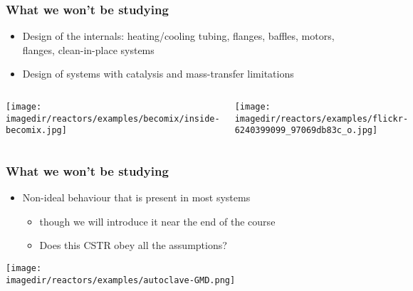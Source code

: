 \begin{frame}\frametitle{What we won't be studying}
	\begin{itemize}
		\item	Design of the internals: heating/cooling tubing, flanges, baffles, motors, flanges, clean-in-place systems
		\item	Design of systems with catalysis and mass-transfer limitations
	\end{itemize}
	\vspace{-12pt}
	\begin{columns}[t]
			\begin{center}
		\texttt{[image: \\imagedir/reactors/examples/becomix/inside-becomix.jpg]}
	\end{center}
			\begin{center}
				\texttt{[image: \\imagedir/reactors/examples/flickr-6240399099\_97069db83c\_o.jpg]}
			\end{center}
			
	\end{columns}	
\end{frame}

\begin{frame}\frametitle{What we won't be studying}
	\begin{itemize}
		\item	Non-ideal behaviour that is present in most systems 
		\begin{itemize}
			\item	though we will introduce it near the end of the course
			\item	Does this CSTR obey all the assumptions?
		\end{itemize}
	\end{itemize}
	\begin{center}
		\texttt{[image: \\imagedir/reactors/examples/autoclave-GMD.png]}
	\end{center}
\end{frame}

